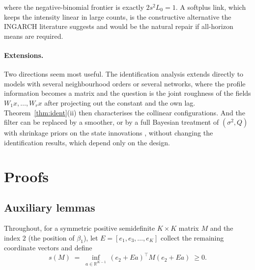 \documentclass[12pt]{article}
\theoremstyle{plain}
\theoremstyle{definition}
\theoremstyle{remark}
\newcommand{\R}{\mathbb{R}}
\newcommand{\T}{^{\top}}
\begin{document}
where the negative-binomial frontier is exactly $2s^2L_0=1$. A softplus link, which keeps the intensity linear in large counts, is the constructive alternative the INGARCH literature suggests and would be the natural repair if all-horizon means are required.

\paragraph{Extensions.} Two directions seem most useful. The identification analysis extends directly to models with several neighbourhood orders \citep{knight2020gnar} or several networks, where the profile information becomes a matrix and the question is the joint roughness of the fields $W_1x,\dots,W_rx$ after projecting out the constant and the own lag. Theorem~\ref{thm:ident}(ii) then characterises the collinear configurations. And the filter can be replaced by a smoother, or by a full Bayesian treatment of $(\sigma^2,Q)$ with shrinkage priors on the state innovations \citep{fruhwirth2010stochastic,bitto2019achieving}, without changing the identification results, which depend only on the design.





\appendix
\section{Proofs}\label{app:proofs}

\subsection{Auxiliary lemmas}

Throughout, for a symmetric positive semidefinite $K\times K$ matrix $M$ and the index $2$ (the position of $\beta_1$), let $E=[e_1,e_3,\dots,e_K]$ collect the remaining coordinate vectors and define
\begin{equation}\label{eq:schurvar}
s(M)\;=\;\inf_{a\in\R^{K-1}}\,(e_2+Ea)\T M(e_2+Ea)\;\ge 0 .
\end{equation}
\end{document}
